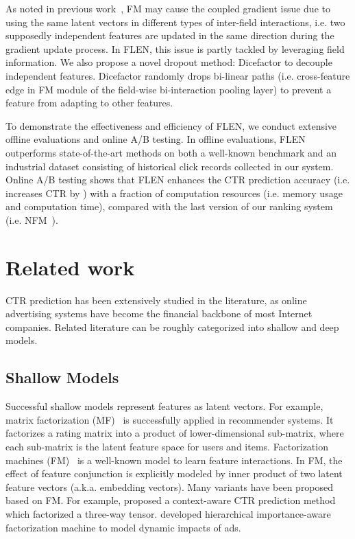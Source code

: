 \documentclass[sigconf]{acmart}
\begin{document}
As noted in previous work~\citep{qu2018product}, FM may cause the coupled gradient issue due to using the same latent vectors in different types of inter-field interactions, i.e. two supposedly independent features are updated in the same direction during the gradient update process.  
In FLEN, this issue is partly tackled by leveraging field information. 
We also propose a novel dropout method: Dicefactor to decouple independent features. 
Dicefactor randomly drops bi-linear paths (i.e. cross-feature edge in FM module of the field-wise bi-interaction pooling layer) to prevent a feature from adapting to other features. 
 
To demonstrate the effectiveness and efficiency of FLEN, we conduct extensive offline evaluations and online A/B testing. 
In offline evaluations, FLEN outperforms state-of-the-art methods on both a well-known benchmark and an industrial dataset consisting of historical click records collected in our system. 
Online A/B testing shows that FLEN enhances the CTR prediction accuracy (i.e. increases CTR by ) with a fraction of computation resources (i.e.  memory usage and computation time), compared with the last version of our ranking system (i.e. NFM~\citep{he2017neural}). 

\section{Related work}
CTR prediction has been extensively studied in the literature, as online advertising systems have become the financial backbone of most Internet companies. 
Related literature can be roughly categorized into shallow and deep models. 

\subsection{Shallow Models}
Successful shallow models represent features as latent vectors. 
For example, matrix factorization (MF)~\citep{Koren2009Matrix} is successfully applied in recommender systems. It factorizes a rating matrix into a product of lower-dimensional sub-matrix, where each sub-matrix is the latent feature space for users and items. 
Factorization machines (FM)~\citep{rendle2010factorization} is a well-known model to learn feature interactions. In FM, the effect of feature conjunction is  explicitly modeled by inner product of two latent feature vectors (a.k.a. embedding vectors).
Many variants have been proposed based on FM. 
For example, \citet{rendle2011fast} proposed a context-aware CTR prediction method which factorized a three-way  tensor. \citet{oentaryo2014predicting} developed hierarchical importance-aware factorization machine to model dynamic impacts of ads. 
\end{document}
